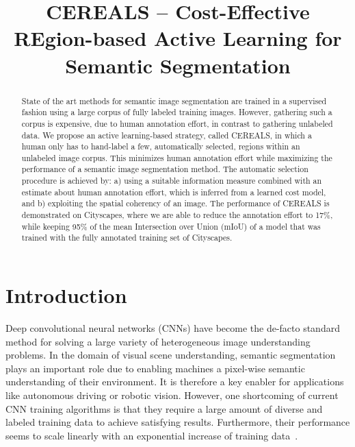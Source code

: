 \documentclass{bmvc2k}
\title{CEREALS -- Cost-Effective REgion-based Active Learning for Semantic Segmentation}
\begin{document}
\maketitle

\begin{abstract}
State of the art methods for semantic image segmentation are trained in a supervised fashion using a large corpus of fully labeled training images. However, gathering such a corpus is expensive, due to human annotation effort, in contrast to gathering unlabeled data. We propose an active learning-based strategy, called CEREALS, in which a human only has to hand-label a few, automatically selected, regions within an unlabeled image corpus. This minimizes human annotation effort while maximizing the performance of a semantic image segmentation method. The automatic selection procedure is achieved by: a) using a suitable information measure combined with an estimate about human annotation effort, which is inferred from a learned cost model, and b) exploiting the spatial coherency of an image. The performance of CEREALS is demonstrated on Cityscapes, where we are able to reduce the annotation effort to 17\%, while keeping 95\% of the mean Intersection over Union (mIoU) of a model that was trained with the fully annotated training set of Cityscapes.
\end{abstract}
\section{Introduction}

Deep convolutional neural networks (CNNs) have become the de-facto standard method for solving a large variety of heterogeneous image understanding problems. In the domain of visual scene understanding, semantic segmentation plays an important role due to enabling machines a pixel-wise semantic understanding of their environment. It is therefore a key enabler for applications like autonomous driving or robotic vision. However, one shortcoming of current CNN training algorithms is that they require a large amount of diverse and labeled training data to achieve satisfying results. Furthermore, their performance seems to scale linearly with an exponential increase of training data~\cite{DBLP:conf/iccv/SunSSG17}.
\end{document}
